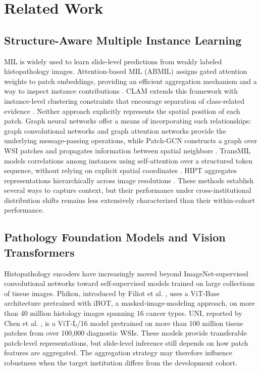 \documentclass[11pt,a4paper]{article}
\begin{document}
\section{Related Work}

\subsection{Structure-Aware Multiple Instance Learning}
MIL is widely used to learn slide-level predictions from weakly labeled histopathology images. Attention-based MIL (ABMIL) assigns gated attention weights to patch embeddings, providing an efficient aggregation mechanism and a way to inspect instance contributions \cite{ref7}. CLAM extends this framework with instance-level clustering constraints that encourage separation of class-related evidence \cite{ref8}. Neither approach explicitly represents the spatial position of each patch. Graph neural networks offer a means of incorporating such relationships: graph convolutional networks \cite{ref15} and graph attention networks \cite{ref16} provide the underlying message-passing operations, while Patch-GCN constructs a graph over WSI patches and propagates information between spatial neighbors \cite{ref9}. TransMIL models correlations among instances using self-attention over a structured token sequence, without relying on explicit spatial coordinates \cite{ref10}. HIPT aggregates representations hierarchically across image resolutions \cite{ref14}. These methods establish several ways to capture context, but their performance under cross-institutional distribution shifts remains less extensively characterized than their within-cohort performance.


\subsection{Pathology Foundation Models and Vision Transformers}
Histopathology encoders have increasingly moved beyond ImageNet-supervised convolutional networks toward self-supervised models trained on large collections of tissue images. Phikon, introduced by Filiot et al. \cite{ref17}, uses a ViT-Base architecture pretrained with iBOT, a masked-image-modeling approach, on more than 40 million histology images spanning 16 cancer types. UNI, reported by Chen et al. \cite{ref13}, is a ViT-L/16 model pretrained on more than 100 million tissue patches from over 100,000 diagnostic WSIs. These models provide transferable patch-level representations, but slide-level inference still depends on how patch features are aggregated. The aggregation strategy may therefore influence robustness when the target institution differs from the development cohort.
\end{document}
